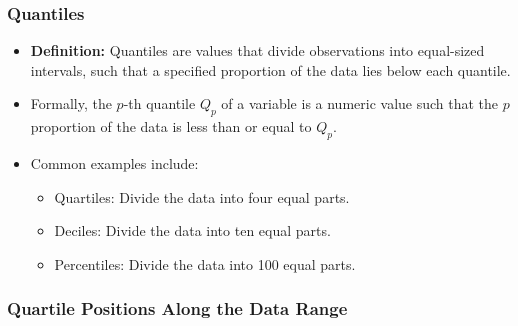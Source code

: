 \documentclass[handout]{beamer} %
\begin{document}
\begin{frame}
\frametitle{Quantiles}
\begin{itemize}
\item \textbf{Definition:} Quantiles are values that divide observations into equal-sized intervals, such that a specified proportion of the data lies below each quantile.
\item Formally, the $p$-th quantile $Q_p$ of a variable is a numeric value such that the $p$ proportion of the data is less than or equal to $Q_p$.
\item Common examples include: \begin{itemize}
        \item Quartiles: Divide the data into four equal parts.
        \item Deciles: Divide the data into ten equal parts.
        \item Percentiles: Divide the data into 100 equal parts.
    \end{itemize}
\end{itemize}
\end{frame}

\begin{frame}
\frametitle{Quartile Positions Along the Data Range}
\centering
{}
\end{frame}
\end{document}
